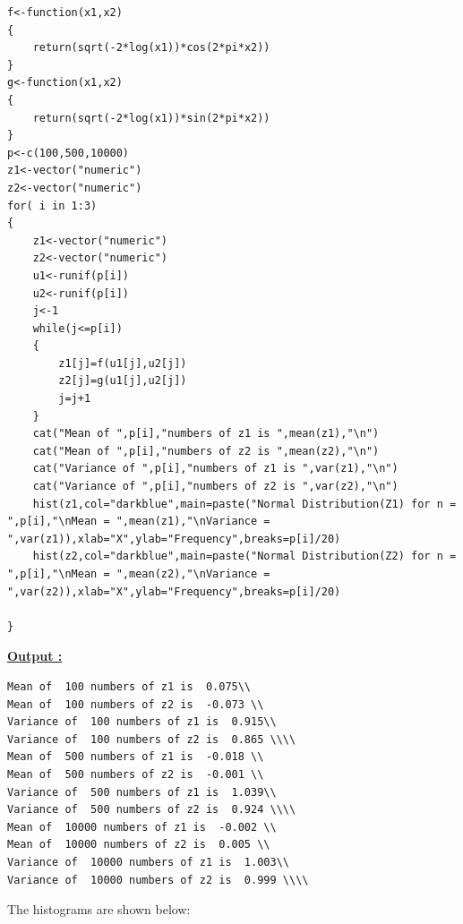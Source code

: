 \documentclass[12pt]{book}
\begin{document}
\begin{lstlisting}
f<-function(x1,x2)
{
	return(sqrt(-2*log(x1))*cos(2*pi*x2))
}
g<-function(x1,x2)
{
	return(sqrt(-2*log(x1))*sin(2*pi*x2))
}
p<-c(100,500,10000)
z1<-vector("numeric")
z2<-vector("numeric")
for( i in 1:3)
{
	z1<-vector("numeric")
	z2<-vector("numeric")
	u1<-runif(p[i])
	u2<-runif(p[i])
	j<-1
	while(j<=p[i])
	{
		z1[j]=f(u1[j],u2[j])
		z2[j]=g(u1[j],u2[j])
		j=j+1
	}
	cat("Mean of ",p[i],"numbers of z1 is ",mean(z1),"\n")
	cat("Mean of ",p[i],"numbers of z2 is ",mean(z2),"\n")
	cat("Variance of ",p[i],"numbers of z1 is ",var(z1),"\n")
	cat("Variance of ",p[i],"numbers of z2 is ",var(z2),"\n")
	hist(z1,col="darkblue",main=paste("Normal Distribution(Z1) for n = ",p[i],"\nMean = ",mean(z1),"\nVariance = ",var(z1)),xlab="X",ylab="Frequency",breaks=p[i]/20)
	hist(z2,col="darkblue",main=paste("Normal Distribution(Z2) for n = ",p[i],"\nMean = ",mean(z2),"\nVariance = ",var(z2)),xlab="X",ylab="Frequency",breaks=p[i]/20)

}
\end{lstlisting}
\newpage
\underline{\textbf{Output :}}\\
\begin{lstlisting}
Mean of  100 numbers of z1 is  0.075\\ 
Mean of  100 numbers of z2 is  -0.073 \\
Variance of  100 numbers of z1 is  0.915\\ 
Variance of  100 numbers of z2 is  0.865 \\\\
Mean of  500 numbers of z1 is  -0.018 \\
Mean of  500 numbers of z2 is  -0.001 \\
Variance of  500 numbers of z1 is  1.039\\ 
Variance of  500 numbers of z2 is  0.924 \\\\
Mean of  10000 numbers of z1 is  -0.002 \\
Mean of  10000 numbers of z2 is  0.005 \\
Variance of  10000 numbers of z1 is  1.003\\ 
Variance of  10000 numbers of z2 is  0.999 \\\\
\end{lstlisting}
\newpage
The histograms are shown below:
\begin{figure}[H]
	\centering
\end{figure}
\end{document}
